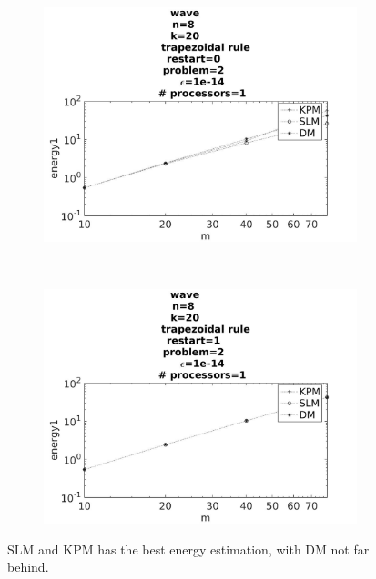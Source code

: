 \begin{figure}[H]
        \centering
        \begin{subfigure}[b]{0.45\textwidth}
                \includegraphics[width=\textwidth]{../MATLAB/fig/vresultenergyr.jpg}
                \caption{  }
                \label{fig:vresultenergy1}
        \end{subfigure}
        ~
        \begin{subfigure}[b]{0.45\textwidth}
                \includegraphics[width=\textwidth]{../MATLAB/fig/vresultenergy.jpg}
                \caption{  }
                \label{fig:vresultenergy2}
        \end{subfigure}
        \caption{ SLM and KPM has the best energy estimation, with DM not far behind. }
        \label{fig:vresultenergy}
\end{figure}

